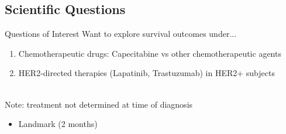 \subsection{Scientific Questions}
\begin{frame}{Questions of Interest}
Want to explore survival outcomes under...
\begin{enumerate}
 \item Chemotherapeutic drugs: Capecitabine vs other chemotherapeutic agents
 \item HER2-directed therapies (Lapatinib, Trastuzumab) in HER2+ subjects \\~\\
 \end{enumerate}
 
 
 Note: treatment not determined at time of diagnosis 
 \begin{itemize}
  \item Landmark (2 months) 
 \end{itemize}
 

\end{frame}


